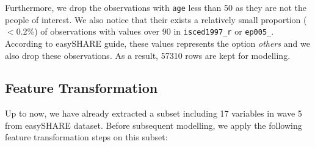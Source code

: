 \documentclass[11pt,twoside]{article}
\numberwithin{Theorem}{section}
\numberwithin{Definition}{section}
\numberwithin{Lemma}{section}
\numberwithin{Algorithm}{section}
\numberwithin{equation}{section}
\begin{document}
Furthermore, we drop the observations with \texttt{age} less than 50 as they are not the people of interest. We also notice that their exists a relatively small proportion ($<$0.2\%) of observations with values over 90 in \texttt{isced1997\_r} or \texttt{ep005\_}. According to easySHARE guide, these values represents the option \emph{others} and we also drop these observations. As a result, 57310 rows are kept for modelling.

\subsection{Feature Transformation}

Up to now, we have already extracted a subset including 17 variables in wave 5 from easySHARE dataset. Before subsequent modelling, we apply the following feature transformation steps on this subset:
\end{document}
